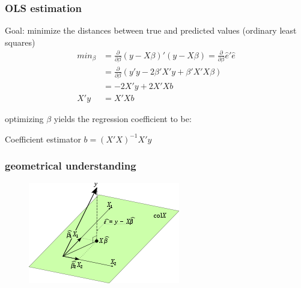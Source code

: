 \documentclass{beamer}
\begin{document}
\begin{frame}
\frametitle{OLS estimation}
Goal: minimize the distances between true and predicted values (ordinary least squares)
\begin{align*} 
min_{\beta} &= \frac{\partial }{\partial \beta} (y - X\beta)'(y - X\beta) = \frac{\partial }{\partial \beta} \hat{e}'\hat{e} \\
    &= \frac{\partial }{\partial \beta} ( y'y -2\beta'X'y + \beta'X'X\beta ) \\
  &= -2X'y   +2 X'Xb \\
  X'y &= X'Xb
\end{align*}

optimizing $\beta$ yields the regression coefficient to be:
\begin{block}{Coefficient estimator}
$ b = (X'X)^{-1}X'y $
\end{block}


\end{frame}


\begin{frame}
\frametitle{geometrical understanding}

\begin{figure}
\includegraphics[width=0.7\linewidth]{figures/03/geometry.png}
\end{figure}
\end{frame}
\end{document}
